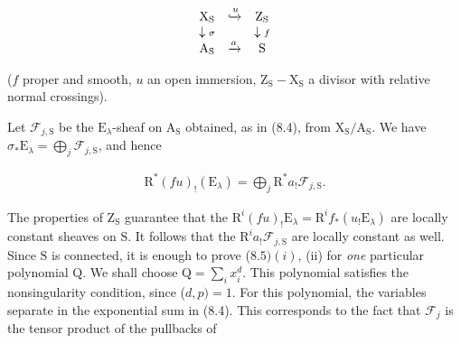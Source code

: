 \documentclass[10pt,leqno]{article}
\begin{document}
\[\begin{array}{ccc}\mathrm X_{\mathrm S}&\xhookrightarrow{u}&\mathrm Z_{\mathrm S}\\ \downarrow{\scriptstyle\sigma}&&\downarrow{\scriptstyle f}\\ \mathrm A_{\mathrm S}&\xrightarrow{a}&\mathrm S\end{array}\]

\noindent (\(f\) proper and smooth, \(u\) an open immersion, \(\mathrm{Z}_{\mathrm{S}}-\mathrm{X}_{\mathrm{S}}\) a divisor with relative normal crossings).\par

\noindent Let \(\mathcal{F} _{j,\mathrm{S}}\) be the \(\mathrm{E}_{\lambda }\)-sheaf on \(\mathrm{A}_{\mathrm{S}}\) obtained, as in (8.4), from \(\mathrm{X}_{\mathrm{S}}/\mathrm{A}_{\mathrm{S}}\). We have \(\sigma _{*}\mathrm{E}_{\lambda } = \bigoplus\limits_{j} \mathcal{F} _{j,\mathrm{S}}\), and hence\par

\begin{equation*}\begin{gathered}\mathrm{R}^{*}(fu)_{!}(\mathrm{E}_{\lambda }) = \bigoplus\limits_{j} \mathrm{R}^{*}a_{!}\mathcal{F} _{j,\mathrm{S}}.\end{gathered}\end{equation*}

\noindent The properties of \(\mathrm{Z}_{\mathrm{S}}\) guarantee that the \(\mathrm{R}^{i}(fu)_{!}\mathrm{E}_{\lambda } = \mathrm{R}^{i}f_{*}(u_{!}\mathrm{E}_{\lambda })\) are locally constant sheaves on \(\mathrm{S}\). It follows that the \(\mathrm{R}^{i}a_{!}\mathcal{F} _{j,\mathrm{S}}\) are locally constant as well. Since \(\mathrm{S}\) is connected, it is enough to prove (\(8.5) (i)\), (ii) for \emph{one} particular polynomial \(\mathrm{Q}\). We shall choose \(\mathrm{Q} = \sum _{i} x_{i}^{d}\). This polynomial satisfies the nonsingularity condition, since (\(d,p) = 1\). For this polynomial, the variables separate in the exponential sum in (8.4). This corresponds to the fact that \(\mathcal{F} _{j}\) is the tensor product of the pullbacks of\par
{}\thispagestyle{signature305}

\clearpage

\label{physical-35}\par\smallskip
\end{document}
